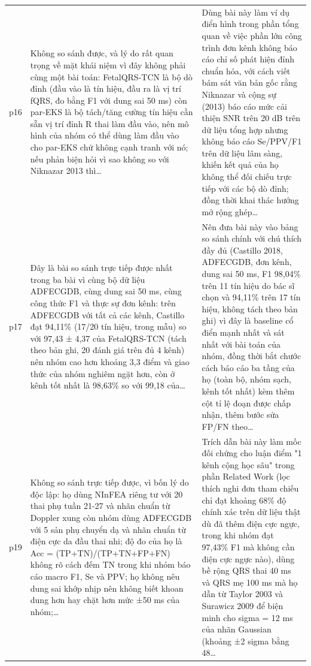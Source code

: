\begin{longtable}{@{}L{1.05cm} L{6.0cm} L{7.2cm}@{}}
p16 & {\scriptsize Không so sánh được, và lý do rất quan trọng về mặt khái niệm vì đây không phải cùng một bài toán: FetalQRS-TCN là bộ dò đỉnh (đầu vào là tín hiệu, đầu ra là vị trí fQRS, đo bằng F1 với dung sai 50 ms) còn par-EKS là bộ tách/tăng cường tín hiệu cần sẵn vị trí đỉnh R thai làm đầu vào, nên mô hình của nhóm có thể dùng làm đầu vào cho par-EKS chứ không cạnh tranh với nó; nếu phản biện hỏi vì sao không so với Niknazar 2013 thì…} & {\scriptsize Dùng bài này làm ví dụ điển hình trong phần tổng quan về việc phần lớn công trình đơn kênh không báo cáo chỉ số phát hiện đỉnh chuẩn hóa, với cách viết bám sát văn bản gốc rằng Niknazar và cộng sự (2013) báo cáo mức cải thiện SNR trên 20 dB trên dữ liệu tổng hợp nhưng không báo cáo Se/PPV/F1 trên dữ liệu lâm sàng, khiến kết quả của họ không thể đối chiếu trực tiếp với các bộ dò đỉnh; đồng thời khai thác hướng mở rộng ghép…} \\[2pt]
p17 & {\scriptsize Đây là bài so sánh trực tiếp được nhất trong ba bài vì cùng bộ dữ liệu ADFECGDB, cùng dung sai 50 ms, cùng công thức F1 và thực sự đơn kênh: trên ADFECGDB với tất cả các kênh, Castillo đạt 94,11\% (17/20 tín hiệu, trong mẫu) so với 97,43 ± 4,37 của FetalQRS-TCN (tách theo bản ghi, 20 đánh giá trên đủ 4 kênh) nên nhóm cao hơn khoảng 3,3 điểm và giao thức của nhóm nghiêm ngặt hơn, còn ở kênh tốt nhất là 98,63\% so với 99,18 của…} & {\scriptsize Nên đưa bài này vào bảng so sánh chính với chú thích đầy đủ (Castillo 2018, ADFECGDB, đơn kênh, dung sai 50 ms, F1 98,04\% trên 11 tín hiệu do bác sĩ chọn và 94,11\% trên 17 tín hiệu, không tách theo bản ghi) vì đây là baseline cổ điển mạnh nhất và sát nhất với bài toán của nhóm, đồng thời bắt chước cách báo cáo ba tầng của họ (toàn bộ, nhóm sạch, kênh tốt nhất) kèm thêm cột tỉ lệ đoạn được chấp nhận, thêm bước sửa FP/FN theo…} \\[2pt]
p19 & {\scriptsize Không so sánh trực tiếp được, vì bốn lý do độc lập: họ dùng NInFEA riêng tư với 20 thai phụ tuần 21-27 và nhãn chuẩn từ Doppler xung còn nhóm dùng ADFECGDB với 5 sản phụ chuyển dạ và nhãn chuẩn từ điện cực da đầu thai nhi; độ đo của họ là Acc = (TP+TN)/(TP+TN+FP+FN) không rõ cách đếm TN trong khi nhóm báo cáo macro F1, Se và PPV; họ không nêu dung sai khớp nhịp nên không biết khoan dung hơn hay chặt hơn mức ±50 ms của nhóm;…} & {\scriptsize Trích dẫn bài này làm mốc đối chứng cho luận điểm "1 kênh cộng học sâu" trong phần Related Work (lọc thích nghi đơn tham chiếu chỉ đạt khoảng 68\% độ chính xác trên dữ liệu thật dù đã thêm điện cực ngực, trong khi nhóm đạt 97,43\% F1 mà không cần điện cực ngực nào), dùng bề rộng QRS thai 40 ms và QRS mẹ 100 ms mà họ dẫn từ Taylor 2003 và Surawicz 2009 để biện minh cho sigma = 12 ms của nhãn Gaussian (khoảng ±2 sigma bằng 48…} \\[2pt]

\end{longtable}
